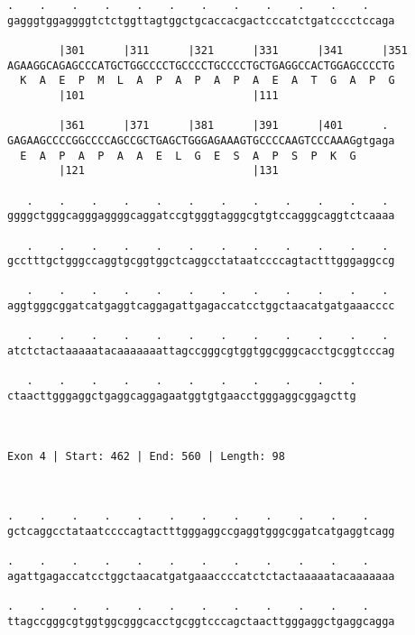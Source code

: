 \documentclass{article}
\begin{document}
\begin{Verbatim}
.    .    .    .    .    .    .    .    .    .    .    .    
gagggtggaggggtctctggttagtggctgcaccacgactcccatctgatcccctccaga
                                                            
        |301      |311      |321      |331      |341      |351
AGAAGGCAGAGCCCATGCTGGCCCCTGCCCCTGCCCCTGCTGAGGCCACTGGAGCCCCTG
  K  A  E  P  M  L  A  P  A  P  A  P  A  E  A  T  G  A  P  G
        |101                          |111                  
  
        |361      |371      |381      |391      |401      . 
GAGAAGCCCCGGCCCCAGCCGCTGAGCTGGGAGAAAGTGCCCCAAGTCCCAAAGgtgaga
  E  A  P  A  P  A  A  E  L  G  E  S  A  P  S  P  K  G      
        |121                          |131                  
  
   .    .    .    .    .    .    .    .    .    .    .    . 
ggggctgggcagggaggggcaggatccgtgggtagggcgtgtccagggcaggtctcaaaa
                                                            
   .    .    .    .    .    .    .    .    .    .    .    . 
gcctttgctgggccaggtgcggtggctcaggcctataatccccagtactttgggaggccg
                                                            
   .    .    .    .    .    .    .    .    .    .    .    . 
aggtgggcggatcatgaggtcaggagattgagaccatcctggctaacatgatgaaacccc
                                                            
   .    .    .    .    .    .    .    .    .    .    .    . 
atctctactaaaaatacaaaaaaattagccgggcgtggtggcgggcacctgcggtcccag
                                                            
   .    .    .    .    .    .    .    .    .    .    .
ctaacttgggaggctgaggcaggagaatggtgtgaacctgggaggcggagcttg
                                                      
                                                      
 
Exon 4 | Start: 462 | End: 560 | Length: 98



.    .    .    .    .    .    .    .    .    .    .    .    
gctcaggcctataatccccagtactttgggaggccgaggtgggcggatcatgaggtcagg
                                                            
.    .    .    .    .    .    .    .    .    .    .    .    
agattgagaccatcctggctaacatgatgaaaccccatctctactaaaaatacaaaaaaa
                                                            
.    .    .    .    .    .    .    .    .    .    .    .    
ttagccgggcgtggtggcgggcacctgcggtcccagctaacttgggaggctgaggcagga
                                                            

\end{Verbatim}
\end{document}
